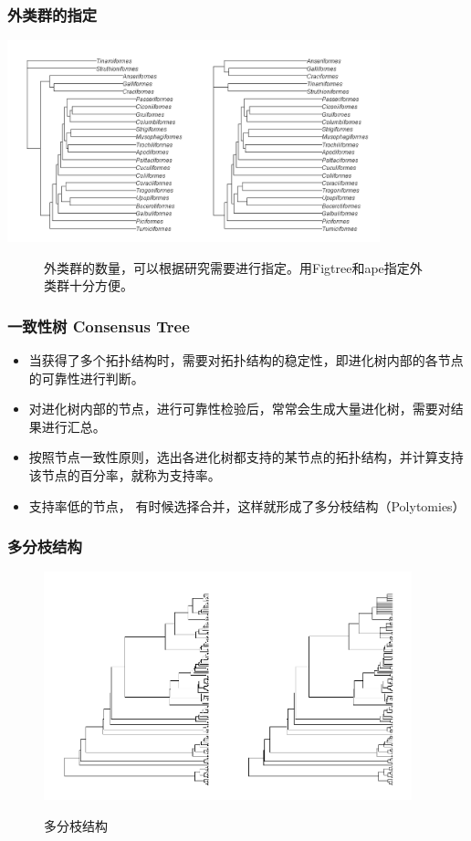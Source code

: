 \documentclass[UTF8]{ctexbeamer}
\begin{document}
\begin{frame}
\frametitle{外类群的指定}
\begin{center}
\includegraphics[height=2.3in]{rooted.png}\\
\end{center}

\begin{figure}
\caption{外类群的数量，可以根据研究需要进行指定。用Figtree和ape指定外类群十分方便。}
\end{figure}

\end{frame}

\begin{frame}
\frametitle{一致性树 Consensus Tree}
\begin{itemize}
\item 当获得了多个拓扑结构时，需要对拓扑结构的稳定性，即进化树内部的各节点的可靠性进行判断。\\
\item 对进化树内部的节点，进行可靠性检验后，常常会生成大量进化树，需要对结果进行汇总。\\
\item 按照节点一致性原则，选出各进化树都支持的某节点的拓扑结构，并计算支持该节点的百分率，就称为支持率。 \\
\item 支持率低的节点， 有时候选择合并，这样就形成了多分枝结构（Polytomies）
\end{itemize}
\end{frame}

\begin{frame}
\frametitle{多分枝结构}
\begin{center}
\begin{figure}
\includegraphics[height=2.6in]{polytomies.png}\\
\caption{多分枝结构}
\end{figure}
\end{center}
\end{frame}
\end{document}
